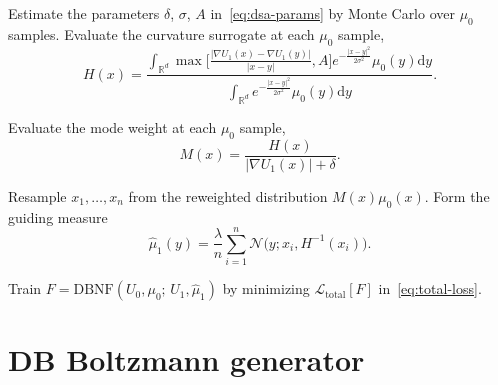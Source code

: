 \documentclass{article}
\newcommand{\D}{\mathrm{d}}
\theoremstyle{plain}
\begin{document}
\begin{algorithm}[h]
    \DontPrintSemicolon
    \caption{Single DB normalizing flow step}\label{alg:dbnf-step}
    Estimate the parameters $\delta$, $\sigma$, $A$ in~\eqref{eq:dsa-params} by Monte Carlo over $\mu_0$ samples.\;
    Evaluate the curvature surrogate at each $\mu_0$ sample,
    \begin{equation*}
        H(x) = \frac{\displaystyle \int_{\mathbb R^d} \max\biggl[\frac{|\nabla U_1(x) - \nabla U_1(y)|}{|x-y|}, A\biggr] e^{-\frac{|x-y|^2}{2\sigma^2}} \mu_0(y) \D y}{\displaystyle \int_{\mathbb R^d} e^{-\frac{|x-y|^2}{2\sigma^2}} \mu_0(y) \D y}.
    \end{equation*}

    Evaluate the mode weight at each $\mu_0$ sample,
    \begin{equation*}
        M(x) = \frac{H(x)}{|\nabla U_1(x)| + \delta}.
    \end{equation*}

    Resample $x_1,\dots,x_n$ from the reweighted distribution $M(x)\mu_0(x)$.\;
    Form the guiding measure
    \begin{equation*}
        \hat\mu_1(y) = \frac{\lambda}n \sum_{i=1}^n \mathcal N\bigl(y; x_i, H^{-1}(x_i)\bigr).
    \end{equation*}

    Train $F = \mathrm{DBNF}(U_0,\mu_0;\, U_1,\hat\mu_1)$ by minimizing $\mathcal L_{\mathrm{total}}[F]$ in~\eqref{eq:total-loss}.\;
\end{algorithm}

\section{DB Boltzmann generator}\label{sec:db-bg}



\end{document}

